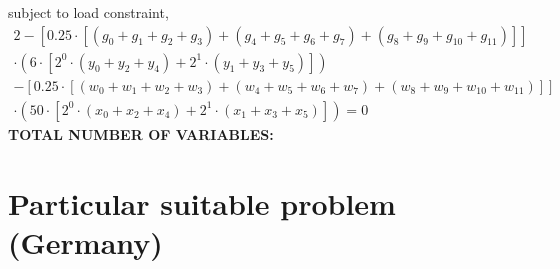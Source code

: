 subject to load constraint,
\begin{align}
    2 - \left[0.25 \cdot \left[\left(g_{0} + g_{1} + g_{2} + g_{3}\right) + \left(g_{4} + g_{5} + g_{6} + g_{7}\right) + \left(g_{8} + g_{9} + g_{10} + g_{11}\right)\right]\right]\\
    \cdot\left(6\cdot \left[2^{0}\cdot\left(y_{0} + y_{2} + y_{4}\right) + 2^{1}\cdot\left(y_{1} + y_{3} + y_{5}\right)\right]\right)\\
    - \left[0.25 \cdot \left[\left(w_{0} + w_{1} + w_{2} + w_{3}\right) + \left(w_{4} + w_{5} + w_{6} + w_{7}\right) + \left(w_{8} + w_{9} + w_{10} + w_{11}\right)\right]\right]\\
    \cdot\left(50\cdot \left[2^{0}\cdot\left(x_{0} + x_{2} + x_{4}\right) + 2^{1}\cdot\left(x_{1} + x_{3} + x_{5}\right)\right]\right) = 0
\end{align}
\textbf{TOTAL NUMBER OF VARIABLES: }
\section{Particular suitable problem (Germany)}


